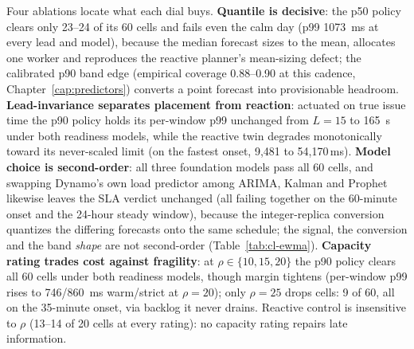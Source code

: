 Four ablations locate what each dial buys. \textbf{Quantile is decisive}: the
p50 policy clears only 23--24 of its 60 cells and fails even the calm day (p99
\SI{1073}{\milli\second} at every lead and model), because the median forecast
sizes to the mean, allocates one worker and reproduces the reactive planner's
mean-sizing defect; the calibrated p90 band edge (empirical coverage 0.88--0.90
at this cadence, Chapter~\ref{cap:predictors}) converts a point forecast into
provisionable headroom. \textbf{Lead-invariance separates placement from
reaction}: actuated on true issue time the p90 policy holds its per-window p99
unchanged from $L{=}15$ to \SI{165}{\second} under both readiness models, while
the reactive twin degrades monotonically toward its never-scaled limit (on the
fastest onset, 9{,}481 to 54{,}170\,\si{\milli\second}). \textbf{Model choice is
second-order}: all three foundation models pass all 60 cells, and swapping
Dynamo's own load predictor among ARIMA, Kalman and Prophet likewise leaves the
SLA verdict unchanged (all failing together on the 60-minute onset and the
24-hour steady window), because the integer-replica conversion quantizes the differing
forecasts onto the same schedule; the signal, the conversion and the band
\emph{shape} are not second-order (Table~\ref{tab:cl-ewma}). \textbf{Capacity
rating trades cost against fragility}: at $\rho \in \{10,15,20\}$ the p90
policy clears all 60 cells under both readiness models, though margin tightens
(per-window p99 rises to \SI{746}{}/\SI{860}{\milli\second} warm/strict at
$\rho{=}20$); only $\rho{=}25$ drops cells: 9 of 60, all on the 35-minute
onset, via backlog it never drains. Reactive control is insensitive to $\rho$ (13--14 of
20 cells at every rating): no capacity rating repairs late information.

